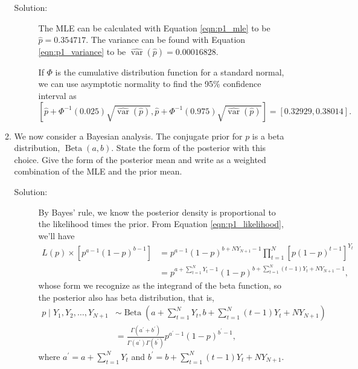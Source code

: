 \documentclass[letterpaper,11pt]{article}
\begin{document}
\begin{enumerate}
\begin{enumerate}
    \begin{description}
    \item[Solution:] The MLE can be calculated with Equation \ref{eqn:p1_mle} to
      be $\boxed{\hat{p} = 0.354717.}$ The variance can be found with Equation
      \ref{eqn:p1_variance} to be
      $\boxed{\hat{\operatorname{var}}\left(\hat{p}\right) = 0.00016828.}$

      If $\Phi$ is the cumulative distribution function for a standard normal,
      we can use asymptotic normality to find the 95\% confidence interval as
      \begin{equation*}
        \left[
          \hat{p} +
          \Phi^{-1}\left(0.025\right)\sqrt{\hat{\operatorname{var}}\left(\hat{p}\right)},
          \hat{p} +
          \Phi^{-1}\left(0.975\right)\sqrt{\hat{\operatorname{var}}\left(\hat{p}\right)}
        \right]
        =
        \boxed{\left[0.32929,0.38014\right].}
      \end{equation*}
    \end{description}
  \item We now consider a Bayesian analysis. The conjugate prior for $p$ is a
    beta distribution, $\operatorname{Beta}\left(a, b\right)$. State the form of
    the posterior with this choice. Give the form of the posterior mean and
    write as a weighted combination of the MLE and the prior mean.

    \begin{description}
    \item[Solution:] By Bayes' rule, we know the posterior density is
      proportional to the likelihood times the prior. From Equation
      \ref{eqn:p1_likelihood}, we'll have
      \begin{align*}
        L\left(p\right) \times \left[
        p^{a-1}\left(1-p\right)^{b-1}
        \right]
        &= p^{a-1}\left(1 - p\right)^{b + NY_{N+1} - 1}
          \prod_{t=1}^N\left[
          p\left(1 - p\right)^{t-1}
          \right]^{Y_t} \\
        &= p^{a + \sum_{t=1}^N Y_t -1}
          \left(1 - p\right)^{b + \sum_{t=1}^N (t-1)Y_t + NY_{N+1} - 1},
      \end{align*}
      whose form we recognize as the integrand of the beta function, so the
      posterior also has beta distribution, that is,
      \begin{align}
        p \mid Y_1,Y_2,\ldots,Y_{N+1}
        &\sim \operatorname{Beta}\left(
          a + \sum_{t=1}^N Y_t,
          b + \sum_{t=1}^N (t-1)Y_t + NY_{N+1}
          \right) \nonumber\\
        &= \frac{\Gamma\left(a^\prime + b^\prime\right)}
          {\Gamma\left(a^\prime\right)\Gamma\left(b^\prime\right)}
          p^{a^\prime -1}\left(1 - p\right)^{b^\prime - 1},
          \label{eqn:p1_posterior}
      \end{align}
      where $a^\prime = a + \sum_{t=1}^N Y_t$ and
      $b^\prime = b + \sum_{t=1}^N (t-1)Y_t + NY_{N+1}$.


\end{description}
\end{enumerate}
\end{enumerate}
\end{document}
